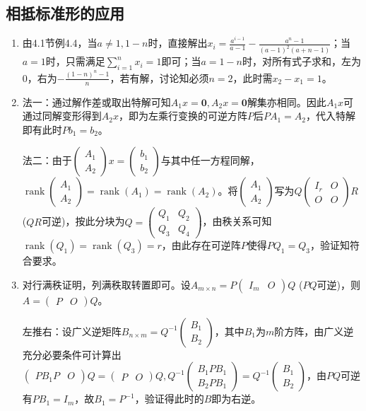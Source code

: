 \documentclass[a4paper,UTF8,fontset=windows]{ctexart}
\DeclareMathOperator{\rank}{rank}
\begin{document}
\subsection{相抵标准形的应用}
\begin{enumerate}
\item
由4.1节例4.4，当$a\ne1,1-n$时，直接解出$x_i=\frac{a^{i-1}}{a-1}-\frac{a^n-1}{(a-1)^2(a+n-1)}$；当$a=1$时，只需满足$\sum_{i=1}^{n}x_i=1$即可；当$a=1-n$时，对所有式子求和，左为0，右为$-\frac{(1-n)^n-1}{n}$，若有解，讨论知必须$n=2$，此时需$x_2-x_1=1$。

\item
法一：通过解作差或取出特解可知$A_1x=\mathbf{0},A_2x=\mathbf{0}$解集亦相同。因此$A_1x$可通过同解变形得到$A_2x$，即为左乘行变换的可逆方阵$P$后$PA_1=A_2$，代入特解即有此时$Pb_1=b_2$。

法二：由于$\begin{pmatrix}A_1\\A_2\end{pmatrix}x=\begin{pmatrix}b_1\\b_2\end{pmatrix}$与其中任一方程同解，$\rank\begin{pmatrix}A_1\\A_2\end{pmatrix}=\rank(A_1)=\rank(A_2)$。将$\begin{pmatrix}A_1\\A_2\end{pmatrix}$写为$Q\begin{pmatrix}I_r&O\\O&O\end{pmatrix}R$ ($QR$可逆)，按此分块为$Q=\begin{pmatrix}Q_1&Q_2\\Q_3&Q_4\end{pmatrix}$，由秩关系可知$\rank(Q_1)=\rank(Q_3)=r$，由此存在可逆阵$P$使得$PQ_1=Q_3$，验证知符合要求。

\item
对行满秩证明，列满秩取转置即可。设$A_{m\times n}=P\begin{pmatrix}I_m&O\end{pmatrix}Q$ ($PQ$可逆)，则$A=\begin{pmatrix}P&O\end{pmatrix}Q$。

左推右：设广义逆矩阵$B_{n\times m}=Q^{-1}\begin{pmatrix}B_1\\B_2\end{pmatrix}$，其中$B_1$为$m$阶方阵，由广义逆充分必要条件可计算出$\begin{pmatrix}PB_1P&O\end{pmatrix}Q=\begin{pmatrix}P&O\end{pmatrix}Q,Q^{-1}\begin{pmatrix}B_1PB_1\\B_2PB_1\end{pmatrix}=Q^{-1}\begin{pmatrix}B_1\\B_2\end{pmatrix}$，由$PQ$可逆有$PB_1=I_m$，故$B_1=P^{-1}$，验证得此时的$B$即为右逆。


\end{enumerate}
\end{document}
